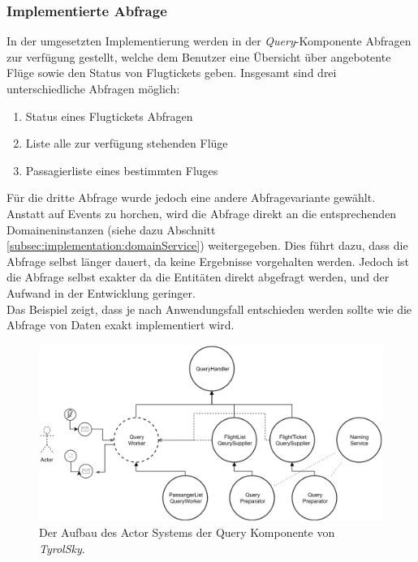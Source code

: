 \subsubsection{Implementierte Abfrage}
In der umgesetzten Implementierung werden in der \textit{Query}-Komponente Abfragen zur verfügung gestellt, welche dem Benutzer eine Übersicht über angebotente Flüge sowie den Status von Flugtickets geben. Insgesamt sind drei unterschiedliche Abfragen möglich:

\begin{enumerate}
    \item Status eines Flugtickets Abfragen
    \item Liste alle zur verfügung stehenden Flüge
    \item Passagierliste eines bestimmten Fluges
\end{enumerate}

Für die dritte Abfrage wurde jedoch eine andere Abfragevariante gewählt. Anstatt auf Events zu horchen, wird die Abfrage direkt an die entsprechenden Domaineninstanzen (siehe dazu Abschnitt \ref{subsec:implementation:domainService}) weitergegeben. Dies führt dazu, dass die Abfrage selbst länger dauert, da keine Ergebnisse vorgehalten werden. Jedoch ist die Abfrage selbst exakter da die Entitäten direkt abgefragt werden, und der Aufwand in der Entwicklung geringer. \\
Das Beispiel zeigt, dass je nach Anwendungsfall entschieden werden sollte wie die Abfrage von Daten exakt implementiert wird.

\begin{figure}
    \centering
    \includegraphics[width=\linewidth]{gfx/implementation/QueringServiceActorModel}
    \caption{Der Aufbau des Actor Systems der Query Komponente von \textit{TyrolSky}.}
    \label{fig:implementation:queryActorModel}
\end{figure} 

